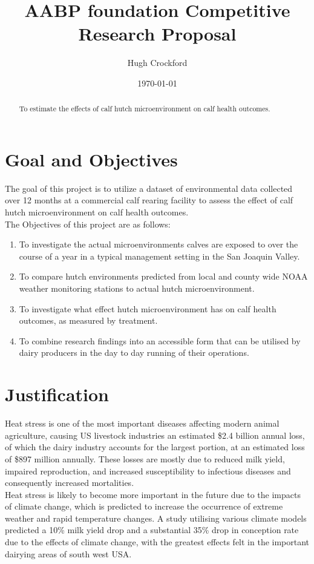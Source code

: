 \documentclass[12pt]{article}
\title{AABP foundation Competitive Research Proposal}
\author{Hugh Crockford}
\date{\today}
\begin{document}
	\maketitle
	\tableofcontents
	
	\newpage
	\begin{abstract}
		To estimate the effects of calf hutch microenvironment on calf health outcomes.
	\end{abstract} 
	\section{Goal and Objectives}
	The goal of this project is to utilize a dataset of environmental data collected over 12 months at a commercial calf rearing facility to assess the effect of calf hutch microenvironment on calf health outcomes.\\


	The Objectives of this project are as follows:
	\begin{enumerate}
		\item To investigate the actual microenvironments calves are exposed to over the course of a year in a typical management setting in the San Joaquin Valley.
		\item To compare hutch environments predicted from local and county wide NOAA weather monitoring stations to actual hutch microenvironment.
		\item To investigate what effect hutch microenvironment has on calf health outcomes, as measured by treatment. %
		\item To combine research findings into an accessible form that can be utilised by dairy producers in the day to day running of their operations.
	\end{enumerate}


	\newpage
	\section{Justification}
	Heat stress is one of the most important diseases affecting modern animal agriculture, causing US livestock industries an estimated \$2.4 billion annual loss, of which the dairy industry accounts for the largest portion, at an estimated loss of \$897 million annually\cite{St-Pierre2003}. 
	These losses are mostly due to reduced milk yield, impaired reproduction, and increased susceptibility to infectious diseases and consequently increased mortalities.\cite{Kadzere2002,Hammami2013}\\
	Heat stress is likely to become more important in the future due to the impacts of climate change, which is predicted to increase the occurrence of extreme weather and rapid temperature changes\cite{Parry2007}. A study utilising various climate models predicted a 10\% milk yield drop and a substantial 35\% drop in conception rate due to the effects of climate change, with the greatest effects felt in the important dairying areas of south west USA\cite{Klinedinst1993}.\\
\end{document}
